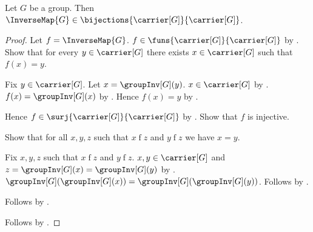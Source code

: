 \begin{theorem}\label{inverse_map_bijection}
    Let $G$ be a group.
    Then $\InverseMap{G}\in
        \bijections{\carrier[G]}{\carrier[G]}$.
\end{theorem}
\begin{proof}
    Let $f=\InverseMap{G}$.
    $f\in\funs{\carrier[G]}{\carrier[G]}$
        by .
    Show that for every $y\in\carrier[G]$ there exists
        $x\in\carrier[G]$ such that $f(x)=y$.
    \begin{subproof}
        Fix $y\in\carrier[G]$.
        Let $x=\groupInv[G](y)$.
        $x\in\carrier[G]$ by .
        $f(x)=\groupInv[G](x)$
            by .
        Hence $f(x)=y$ by .
    \end{subproof}
    Hence $f\in\surj{\carrier[G]}{\carrier[G]}$
        by .
    Show that $f$ is injective.
    \begin{subproof}
        Show that for all $x,y,z$ such that $x\mathrel{f}z$ and
            $y\mathrel{f}z$ we have $x=y$.
        \begin{subproof}
            Fix $x,y,z$ such that $x\mathrel{f}z$ and $y\mathrel{f}z$.
            $x,y\in\carrier[G]$ and
                $z=\groupInv[G](x)=\groupInv[G](y)$
                by .
            $\groupInv[G](\groupInv[G](x))
                =\groupInv[G](\groupInv[G](y))$.
            Follows by .
        \end{subproof}
        Follows by .
    \end{subproof}
    Follows by .
\end{proof}

